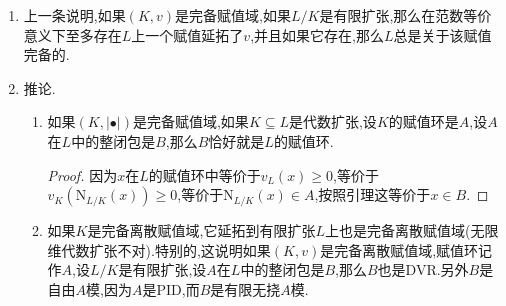 \begin{enumerate}
\begin{proof}
    	需要证明的是存在正实数$a,b$使得$a\Vert x\Vert\le|x|\le b\Vert x\Vert,\forall x\in V$.这里$b$可以直接取为$\sum_i|v_i|$.我们用归纳法证明$a$的存在性.对$n=1$只需取$a=|v_1|$.假设对$n-1$维线性空间命题成立,设$V_i=\oplus_{j\not=i}Kv_j$,那么$V=V_i\oplus Kv_i$.这里$|\bullet|$限制在$V_i$上是完备的,于是它是$V$的闭子集.于是平移得到$V_i+v_i$是闭子集.于是$\cup_{1\le i\le n}(V_i+v_i)$是$V$的闭子集.按照0元不在这个并里,得到0的一个开邻域和这个并无交,也即存在$a>0$使得$|x_i+v_i|\ge a$,$\forall x_i\in V_i$和$1\le i\le n$.现在取$x=\sum_ix_iv_i\not=0$,设$|x_r|=\max\{|x_i|\}$,那么有$|x_r^{-1}x|=\left|\sum_i\frac{x_i}{x_r}v_i\right|\ge a$,于是$|x|\ge a|x_r|=a\Vert x\Vert$.
    \end{proof}
    \item 上一条说明,如果$(K,v)$是完备赋值域,如果$L/K$是有限扩张,那么在范数等价意义下至多存在$L$上一个赋值延拓了$v$,并且如果它存在,那么$L$总是关于该赋值完备的.
    \item 推论.
    \begin{enumerate}
    	\item 如果$(K,|\bullet|)$是完备赋值域,如果$K\subseteq L$是代数扩张,设$K$的赋值环是$A$,设$A$在$L$中的整闭包是$B$,那么$B$恰好就是$L$的赋值环.
    	\begin{proof}
    		
    		因为$x$在$L$的赋值环中等价于$v_L(x)\ge0$,等价于$v_K(\mathrm{N}_{L/K}(x))\ge0$,等价于$\mathrm{N}_{L/K}(x)\in A$,按照引理这等价于$x\in B$.
    	\end{proof}
        \item 如果$K$是完备离散赋值域,它延拓到有限扩张$L$上也是完备离散赋值域(无限维代数扩张不对).特别的,这说明如果$(K,v)$是完备离散赋值域,赋值环记作$A$,设$L/K$是有限扩张,设$A$在$L$中的整闭包是$B$,那么$B$也是DVR.另外$B$是自由$A$模,因为$A$是PID,而$B$是有限无挠$A$模.
    \end{enumerate}
\end{enumerate}

